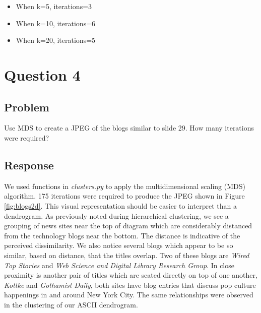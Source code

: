 \documentclass[letterpaper,11pt]{report}
\begin{document}
\begin{savenotes}
\begin{itemize}
\item When k=5, iterations=3
\item When k=10, iterations=6
\item When k=20, iterations=5
\end{itemize}

\section{Question 4}
\subsection{Problem}Use MDS to create a JPEG of the blogs similar to slide 29.  How many iterations were required?

\subsection{Response}We used functions in \emph{clusters.py} to apply the multidimensional scaling (MDS) algorithm. 175 iterations were required to produce the JPEG shown in Figure \ref{fig:blogs2d}. This visual representation should be easier to interpret than a dendrogram. As previously noted during hierarchical clustering, we see a grouping of news sites near the top of diagram which are considerably distanced from the technology blogs near the bottom. The distance is indicative of the perceived dissimilarity. We also notice several blogs which appear to be so similar, based on distance, that the titles overlap. Two of these blogs are \emph{Wired Top Stories} and \emph{Web Science and Digital Library Research Group}. In close proximity is another pair of titles which are seated directly on top of one another, \emph{Kottke} and \emph{Gothamist Daily}, both sites have blog entries that discuss pop culture happenings in and around New York City. The same relationships were observed in the clustering of our ASCII dendrogram.


\end{savenotes}
\end{document}
